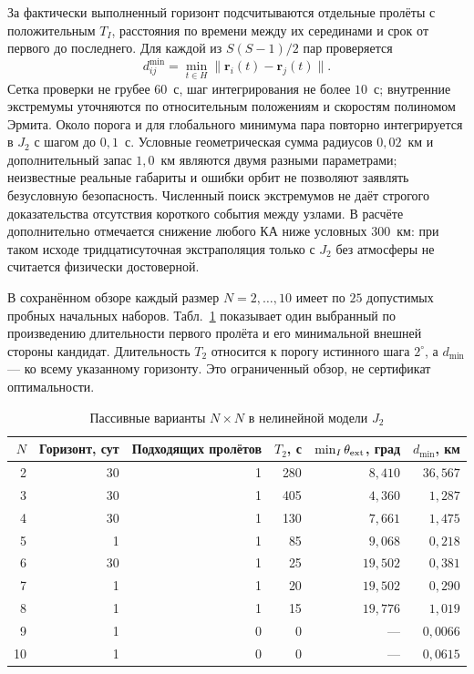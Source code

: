 \documentclass[a4paper,12pt]{article}
\begin{document}
За фактически выполненный горизонт подсчитываются отдельные
пролёты с положительным $T_I$, расстояния по времени между
их серединами и срок от первого до последнего. Для каждой
из $S(S-1)/2$ пар проверяется
\begin{equation}
 d_{ij}^{\min}=\min_{t\in H}\|\mathbf r_i(t)-\mathbf r_j(t)\|.
\end{equation}
Сетка проверки не грубее $60$~с, шаг интегрирования не более
$10$~с; внутренние экстремумы уточняются по относительным
положениям и скоростям полиномом Эрмита. Около порога и для
глобального минимума пара повторно интегрируется в $J_2$
с шагом до $0{,}1$~с. Условные геометрическая сумма радиусов
$0{,}02$~км и дополнительный запас $1{,}0$~км являются
двумя разными параметрами; неизвестные реальные габариты
и ошибки орбит не позволяют заявлять безусловную безопасность.
Численный поиск экстремумов не даёт строгого доказательства
отсутствия короткого события между узлами.
В расчёте дополнительно отмечается снижение любого КА ниже
условных $300$~км: при таком исходе тридцатисуточная
экстраполяция только с $J_2$ без атмосферы не считается
физически достоверной.

В сохранённом обзоре каждый размер $N=2,\ldots,10$ имеет
по $25$ допустимых пробных начальных наборов. Табл.~\ref{tab:passive_study}
показывает один выбранный по произведению длительности
первого пролёта и его минимальной внешней стороны кандидат.
Длительность $T_2$ относится к порогу истинного шага
$2^\circ$, а $d_{\min}$ --- ко всему указанному горизонту.
Это ограниченный обзор, не сертификат оптимальности.

\begin{table}[ht]
\centering
\small
\caption{Пассивные варианты $N\times N$ в нелинейной модели $J_2$}
\label{tab:passive_study}
\begin{tabular}{rrrrrr}
\toprule
$N$ & Горизонт, сут & Подходящих пролётов & $T_2$, с &
$\min_I\theta_{\rm ext}$, град & $d_{\min}$, км\\
\midrule
2 & 30 & 1 & 280 & $8{,}410$ & $36{,}567$\\
3 & 30 & 1 & 405 & $4{,}360$ & $1{,}287$\\
4 & 30 & 1 & 130 & $7{,}661$ & $1{,}475$\\
5 & 1  & 1 & 85  & $9{,}068$ & $0{,}218$\\
6 & 30 & 1 & 25  & $19{,}502$ & $0{,}381$\\
7 & 1  & 1 & 20  & $19{,}502$ & $0{,}290$\\
8 & 1  & 1 & 15  & $19{,}776$ & $1{,}019$\\
9 & 1  & 0 & 0   & --- & $0{,}0066$\\
10& 1  & 0 & 0   & --- & $0{,}0615$\\
\bottomrule
\end{tabular}
\end{table}
\end{document}
